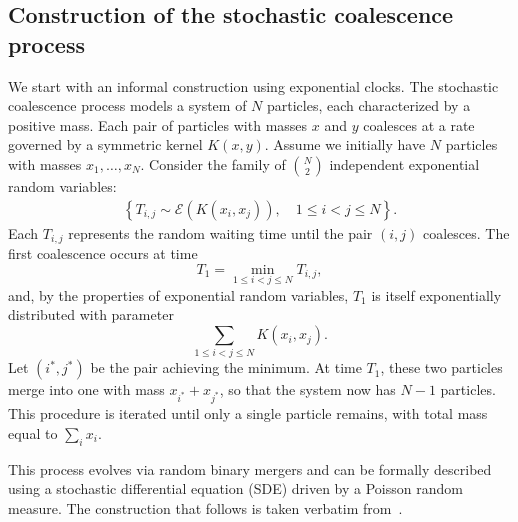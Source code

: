 \documentclass[11pt,a4paper]{article}
\begin{document}
\subsection{Construction of the stochastic coalescence process}
We start with an informal construction using exponential clocks. The stochastic coalescence process models a system of $N$ particles, each characterized by a positive mass. Each pair of particles with masses $x$ and $y$ coalesces at a rate governed by a symmetric kernel $K(x,y)$. Assume we initially have $N$ particles with masses $x_{1}, \ldots, x_{N}$. Consider the family of $\binom{N}{2}$ independent exponential random variables:
\begin{align*}
    \left\lbrace T_{i,j} \sim \mathcal{E}\left(K(x_{i},x_{j})\right), \quad 1 \leq i < j \leq N \right\rbrace.
\end{align*}
Each $T_{i,j}$ represents the random waiting time until the pair $(i,j)$ coalesces. The first coalescence occurs at time
\[
    T_1 = \min_{1 \leq i < j \leq N} T_{i,j},
\]
and, by the properties of exponential random variables, $T_1$ is itself exponentially distributed with parameter
\[
    \sum_{1 \leq i < j \leq N} K(x_{i},x_{j}).
\]
Let $(i^*, j^*)$ be the pair achieving the minimum. At time $T_1$, these two particles merge into one with mass $x_{i^*} + x_{j^*}$, so that the system now has $N-1$ particles. This procedure is iterated until only a single particle remains, with total mass equal to $\sum_i x_i$.

\medskip

This process evolves via random binary mergers and can be formally described using a stochastic differential equation (SDE) driven by a Poisson random measure. The construction that follows is taken verbatim from~\cite{fournier2006some,fournierStochasticCoalescenceHomogeneouslike2009}.

\medskip
\end{document}
